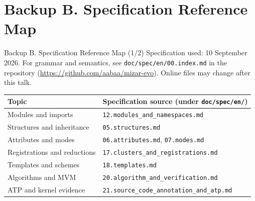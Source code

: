 \documentclass[aspectratio=169,11pt]{beamer}
\begin{document}
\section{Backup B. Specification Reference Map}
\begin{frame}[fragile,t]{Backup B. Specification Reference Map (1/2)}
Specification used: 10 September 2026. For grammar and semantics, see \texttt{doc/spec/en/00.index.md} in the repository (\url{https://github.com/aabaa/mizar-evo}). Online files may change after this talk.

\begin{footnotesize}
\setlength{\tabcolsep}{3pt}
\renewcommand{\arraystretch}{1.15}
\begin{tabularx}{\textwidth}{>{\raggedright\arraybackslash}X>{\raggedright\arraybackslash}X}
\toprule
\textbf{Topic} & \textbf{Specification source (under \texttt{doc/spec/en/})} \\
\midrule
Modules and imports & \texttt{12.modules\_and\_namespaces.md} \\
Structures and inheritance & \texttt{05.structures.md} \\
Attributes and modes & \texttt{06.attributes.md}, \texttt{07.modes.md} \\
Registrations and reductions & \texttt{17.clusters\_and\_registrations.md} \\
Templates and schemes & \texttt{18.templates.md} \\
Algorithms and MVM & \texttt{20.algorithm\_and\_verification.md} \\
ATP and kernel evidence & \texttt{21.source\_code\_annotation\_and\_atp.md} \\
\bottomrule
\end{tabularx}
\end{footnotesize}

\end{frame}
\end{document}
